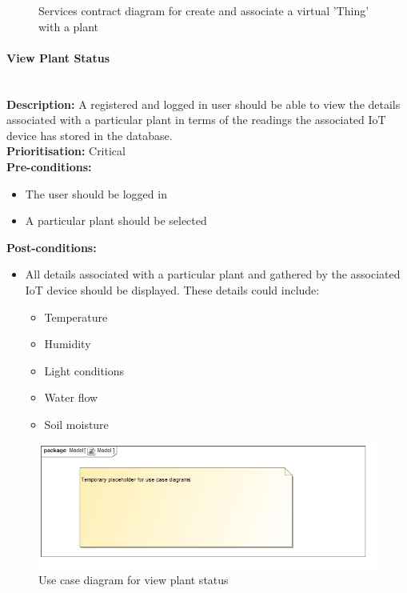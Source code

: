 \documentclass{article}
\begin{document}
		\begin{figure}[H]
			\caption{Services contract diagram for create and associate a virtual 'Thing' with a plant}
		\end{figure}
		
	\paragraph{View Plant Status}\mbox{}\\
		\textbf{Description:} A registered and logged in user should be able to view the details associated with a particular plant in terms of the readings the associated IoT device has stored in the database.\\
		\textbf{Prioritisation:} Critical\\		
		\textbf{Pre-conditions:}
			\begin{itemize}
				\item The user should be logged in
				\item A particular plant should be selected
			\end{itemize}
		\textbf{Post-conditions:}
			\begin{itemize}
				\item All details associated with a particular plant and gathered by the associated IoT device should be displayed. These details could include:
				\begin{itemize}
					\item Temperature
					\item Humidity
					\item Light conditions
					\item Water flow
					\item Soil moisture
				\end{itemize}
			\end{itemize}

		\begin{figure}[H]
			\includegraphics[width=\linewidth]{images/tempUseCase.jpg}
			\caption{Use case diagram for view plant status}
		\end{figure}
		
\end{document}
